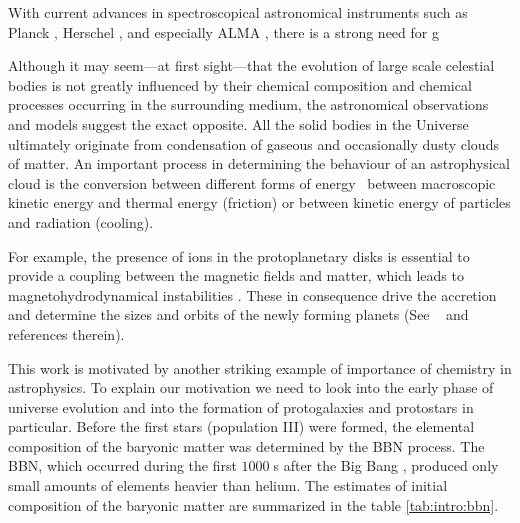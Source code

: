 With current advances in spectroscopical astronomical instruments such
as Planck \citep{planck2011}, Herschel \citep{herschel2010},
and especially ALMA \citep{semenov2008}, there is a strong need for
g

Although it may seem---at first sight---that the evolution of large scale
celestial bodies is not greatly influenced by their chemical
composition and chemical processes occurring in the surrounding medium,
the astronomical observations and models suggest the exact opposite.
All the solid bodies in the Universe ultimately originate from
condensation of gaseous and occasionally dusty clouds of matter. An
important process in determining the behaviour of an astrophysical
cloud is the conversion between different forms of energy \eg\ between
macroscopic kinetic energy and thermal energy (friction) or between
kinetic energy of particles and radiation (cooling).

For example, the presence of ions in the protoplanetary disks is essential
to provide a coupling between the magnetic fields and matter, which leads
to magnetohydrodynamical instabilities \citep{balbus1991}. These in
consequence drive the
accretion and determine the sizes and orbits of the newly forming planets
(See \eg\ \cite{wardle2007,semenov2008} and references therein).

This work is motivated by another striking example of importance of chemistry
in astrophysics. To explain our motivation we need to look into the early phase
of universe evolution and into the formation of protogalaxies and
protostars in particular. Before the first stars (population III) were formed,
the elemental composition of the baryonic matter was determined by the \ac{BBN}
process.
The \ac{BBN}, which occurred during the first $1000\;$s after the Big Bang
\citep{walker1991}, produced
only small amounts of elements heavier than helium. The estimates of initial
composition of the baryonic matter are summarized in the table
\ref{tab:intro:bbn}.
\begin{table}
    \caption{Measured abundances of the elements after the Big Bang
    nucleosynthesis \citep{yao2006}. The primordial density of ${}^3$He has
    not been determined from observations, but the observations of more recent
    astronomical objects and models suggest a value of the order
    $10^{-5}$ \citep{balser1999}. Other elements are expected to be present at
    relative concentrations below $10^{-10}$ \citep{vangioni2000}.}
    \label{tab:intro:bbn}
\end{table}


